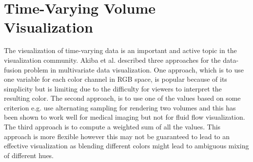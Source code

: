 \documentclass{egpubl}
\begin{document}
\section{Time-Varying Volume Visualization}
The visualization of time-varying data is an important and active topic in the visualization community. 
Akiba et al. \cite{akiba_visualizing_2007} described three approaches for the data-fusion problem in multivariate data visualization.
One approach, which is to use one variable for each color channel in RGB space, is popular because of its simplicity but is limiting due to the difficulty for viewers to interpret the resulting color.
The second approach, is to use one of the values based on some criterion e.g. \cite{hastreiter_integrated_1998}
use alternating sampling for rendering two volumes and this has been shown to work well for medical imaging but not for fluid flow visualization.
The third approach is to compute a weighted sum of all the values. This approach is more flexible however this may not be guaranteed to lead to an effective visualization as blending different colors might lead to ambiguous mixing of different hues.
\end{document}
